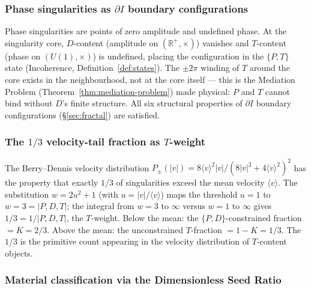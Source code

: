 \documentclass[11pt,a4paper]{article}
\theoremstyle{definition}
\theoremstyle{remark}
\newcommand{\R}{\mathbb{R}}
\begin{document}
\subsubsection*{Phase singularities as $\partial I$ boundary configurations}

Phase singularities are points of zero amplitude and undefined phase. At the singularity core, $D$-content (amplitude on $(\R^{+},\times)$) vanishes and $T$-content (phase on $(U(1),\times)$) is undefined, placing the configuration in the $\{P,T\}$ state (Incoherence, Definition~\ref{def:states}). The $\pm 2\pi$ winding of $T$ around the core exists in the neighbourhood, not at the core itself --- this is the Mediation Problem (Theorem~\ref{thm:mediation-problem}) made physical: $P$ and $T$ cannot bind without $D$'s finite structure. All six structural properties of $\partial I$ boundary configurations (\S\ref{sec:fractal}) are satisfied.

\subsubsection*{The $1/3$ velocity-tail fraction as $T$-weight}

The Berry--Dennis velocity distribution $P_{\pm}(|v|) = 8\langle v\rangle^{2}|v|/(8|v|^{2}+4\langle v\rangle^{2})^{2}$ has the property that exactly $1/3$ of singularities exceed the mean velocity $\langle v\rangle$. The substitution $w = 2u^{2}+1$ (with $u = |v|/\langle v\rangle$) maps the threshold $u=1$ to $w=3=|{P,D,T}|$; the integral from $w=3$ to $\infty$ versus $w=1$ to $\infty$ gives $1/3 = 1/|{P,D,T}|$, the $T$-weight. Below the mean: the $\{P,D\}$-constrained fraction $= K = 2/3$. Above the mean: the unconstrained $T$-fraction $= 1-K = 1/3$. The $1/3$ is the primitive count appearing in the velocity distribution of $T$-content objects.

\subsubsection*{Material classification via the Dimensionless Seed Ratio}
\end{document}
